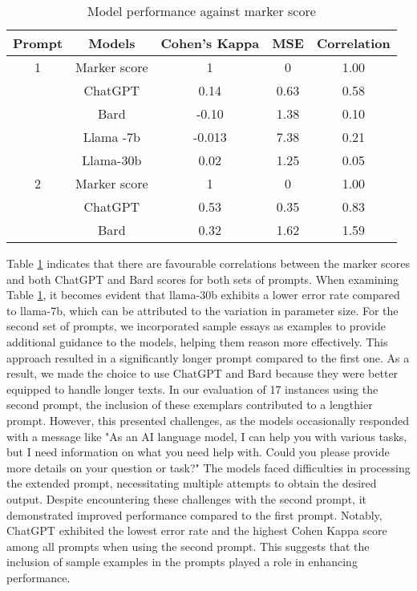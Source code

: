 \documentclass{article}
\begin{document}
\begin{table}[h]
  \caption{ Model performance against marker score}
  \label{tab:ModelResults}
  \begin{tabular}{ccccc}
    \toprule
Prompt & Models& Cohen's Kappa& MSE & Correlation\\
    \midrule
    1 & Marker score & 1 & 0 &1.00 \\
      & ChatGPT & 0.14 & 0.63 & 0.58 \\
      & Bard & -0.10 & 1.38 & 0.10 \\
      & Llama -7b & -0.013 & 7.38 & 0.21\\
      & Llama-30b & 0.02 & 1.25 & 0.05 \\
    \midrule
    2 & Marker score & 1 & 0 & 1.00\\
      & ChatGPT & 0.53 & 0.35  & 0.83\\
      & Bard & 0.32 & 1.62 & 1.59\\
    \bottomrule
  \end{tabular}
\end{table}

Table \ref{tab:ModelResults} indicates that there are favourable correlations between the marker scores and both ChatGPT and Bard scores for both sets of prompts. When examining Table \ref{tab:ModelResults}, it becomes evident that llama-30b exhibits a lower error rate compared to llama-7b,  which can be attributed to the variation in parameter size. For the second set of prompts, we incorporated sample essays as examples to provide additional guidance to the models, helping them reason more effectively. This approach resulted in a significantly longer prompt compared to the first one. As a result, we made the choice to use ChatGPT and Bard because they were better equipped to handle longer texts. In our evaluation of 17 instances using the second prompt, the inclusion of these exemplars contributed to a lengthier prompt. However, this presented challenges, as the models occasionally responded with a message like "As an AI language model, I can help you with various tasks, but I need information on what you need help with. Could you please provide more details on your question or task?" The models faced difficulties in processing the extended prompt, necessitating multiple attempts to obtain the desired output. Despite encountering these challenges with the second prompt, it demonstrated improved performance compared to the first prompt. Notably, ChatGPT exhibited the lowest error rate and the highest Cohen Kappa score among all prompts when using the second prompt. This suggests that the inclusion of sample examples in the prompts played a role in enhancing performance.  
\end{document}
